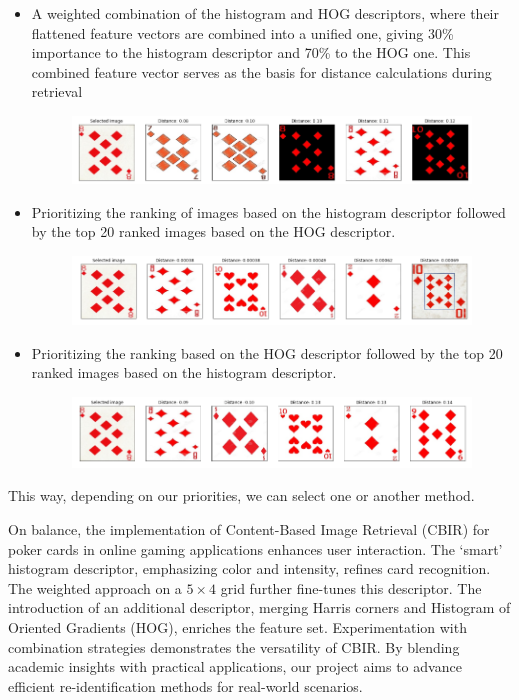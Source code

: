 \documentclass[12pt]{article}
\begin{document}
\begin{itemize}
    \item A weighted combination of the histogram and HOG descriptors, where their flattened feature vectors are combined into a unified one, giving 30\% importance to the histogram descriptor and 70\% to the HOG one. This combined feature vector serves as the basis for distance calculations during retrieval
    \begin{figure}[H]
        \centering
        \includegraphics[width=\textwidth]{imgs/comb1.png}
    \end{figure}
    \item Prioritizing the ranking of images based on the histogram descriptor followed by the top 20 ranked images based on the HOG descriptor.
    \begin{figure}[H]
        \centering
        \includegraphics[width=\textwidth]{imgs/comb2.png}
    \end{figure}
    \item Prioritizing the ranking based on the HOG descriptor followed by the top 20 ranked images based on the histogram descriptor.
    \begin{figure}[H]
        \centering
        \includegraphics[width=\textwidth]{imgs/comb3.png}
    \end{figure}
\end{itemize}

This way, depending on our priorities, we can select one or another method.

On balance, the implementation of Content-Based Image Retrieval (CBIR) for poker cards in online gaming applications enhances user interaction. The `smart' histogram descriptor, emphasizing color and intensity, refines card recognition. The weighted approach on a $5 \times 4$ grid further fine-tunes this descriptor. The introduction of an additional descriptor, merging Harris corners and Histogram of Oriented Gradients (HOG), enriches the feature set. Experimentation with combination strategies demonstrates the versatility of CBIR. By blending academic insights with practical applications, our project aims to advance efficient re-identification methods for real-world scenarios.


\printbibliography[heading=bibintoc]
\end{document}
